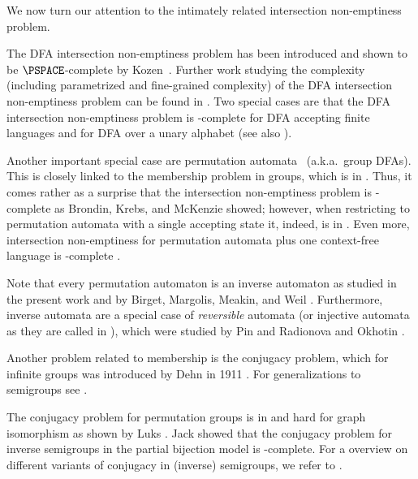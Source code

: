 \medbreak

We now turn our attention to the intimately related intersection non-emptiness problem.

The DFA intersection non-emptiness problem has been introduced and shown to be $\PSPACE$-complete by Kozen~\cite{koz77}.
Further work studying the complexity (including parametrized and fine-grained complexity) of the DFA intersection non-emptiness problem can be found in \cite{FernauHW21,KarakostasLV03,LangeR92,HolzerK11,SwernofskyW15,Wehar14,OliveiraW20,ArrighiFHHJOW21}.
Two special cases are that the DFA intersection non-emptiness problem is \NP-complete for DFA accepting finite languages \cite{RampersadS10} and for DFA over a unary alphabet \cite{StockmeyerM73} (see also \cite{FernauK17}).

Another important special case are permutation automata~\cite{Thierrin68} (a.k.a.\ group DFAs). 
This is closely linked to the membership problem in groups, which is in \NC \cite{BabaiLS87}. 
Thus, it comes rather as a surprise that the intersection non-emptiness problem is \NP-complete as Brondin, Krebs, and McKenzie \cite{BlondinKM12} showed; however, when restricting to permutation automata with a single accepting state it, indeed, is in \NC \cite{BlondinKM12}.
Even more, intersection non-emptiness for permutation automata plus one context-free language is \PSPACE-complete \cite{LohreyRZ22}.

Note that every permutation automaton is an inverse automaton as studied in the present work and \eg by Birget, Margolis, Meakin, and Weil \cite{BirgetMMW94}.
Furthermore, inverse automata are a special case of \emph{reversible} automata (or injective automata as they are called in \cite{BirgetMMW94}), which were studied \eg by Pin \cite{Pin87} and Radionova and Okhotin \cite{RadionovaO24}.




\medbreak

Another problem related to membership is the conjugacy problem, which for infinite groups was introduced by Dehn in 1911 \cite{Dehn11}.
For generalizations to semigroups see \cite{Otto84}.

The conjugacy problem for permutation groups is in \NP and hard for graph isomorphism as shown by Luks \cite{Luks93}.
Jack \cite{Jack23} showed that the conjugacy problem for inverse semigroups in the partial bijection model is \PSPACE-complete. 
For a overview on different variants of conjugacy in (inverse) semigroups, we refer to \cite{AraujoKinyonKnieczny19}.

